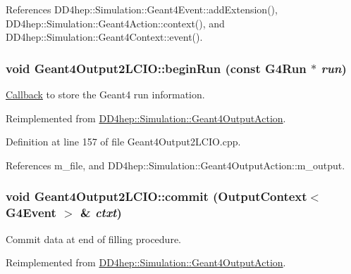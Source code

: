 References DD4hep::Simulation::Geant4Event::addExtension(), DD4hep::Simulation::Geant4Action::context(), and DD4hep::Simulation::Geant4Context::event().\hypertarget{class_d_d4hep_1_1_simulation_1_1_geant4_output2_l_c_i_o_aebca66a953f5c24b0098b5066fe4c3fc}{
\subsubsection[{beginRun}]{\setlength{\rightskip}{0pt plus 5cm}void Geant4Output2LCIO::beginRun (const G4Run $\ast$ {\em run})}}
\label{class_d_d4hep_1_1_simulation_1_1_geant4_output2_l_c_i_o_aebca66a953f5c24b0098b5066fe4c3fc}


\hyperlink{class_d_d4hep_1_1_callback}{Callback} to store the Geant4 run information. 

Reimplemented from \hyperlink{class_d_d4hep_1_1_simulation_1_1_geant4_output_action_afc8b13d72433d8f917555e952e1ce528}{DD4hep::Simulation::Geant4OutputAction}.

Definition at line 157 of file Geant4Output2LCIO.cpp.

References m\_\-file, and DD4hep::Simulation::Geant4OutputAction::m\_\-output.\hypertarget{class_d_d4hep_1_1_simulation_1_1_geant4_output2_l_c_i_o_a86575064911453b387f237077fa8a969}{
\subsubsection[{commit}]{\setlength{\rightskip}{0pt plus 5cm}void Geant4Output2LCIO::commit ({\bf OutputContext}$<$ G4Event $>$ \& {\em ctxt})}}
\label{class_d_d4hep_1_1_simulation_1_1_geant4_output2_l_c_i_o_a86575064911453b387f237077fa8a969}


Commit data at end of filling procedure. 

Reimplemented from \hyperlink{class_d_d4hep_1_1_simulation_1_1_geant4_output_action_a1d83299b79de6a1a75e70ef5a9e4d3eb}{DD4hep::Simulation::Geant4OutputAction}.

